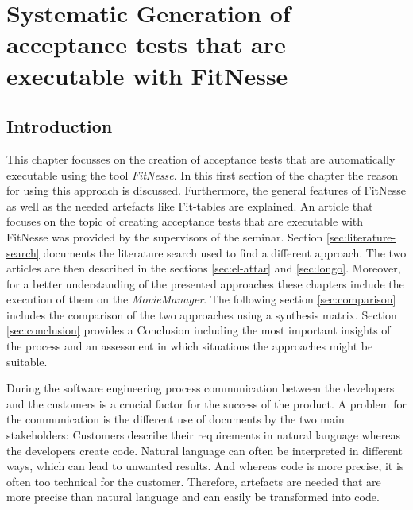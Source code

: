 

\chapter{Systematic Generation of acceptance tests that are executable with FitNesse}
\label{sec:topic_2}

\section{Introduction}

This chapter focusses on the creation of acceptance tests that are automatically executable using the tool \textit{FitNesse}.
In this first section of the chapter the reason for using this approach is discussed.
Furthermore, the general features of FitNesse as well as the needed artefacts like Fit-tables are explained.
An article that focuses on the topic of creating acceptance tests that are executable with FitNesse was provided by the supervisors of the seminar.
Section \ref{sec:literature-search} documents the literature search used to find a different approach.
The two articles are then described in the sections \ref{sec:el-attar} and \ref{sec:longo}.
Moreover, for a better understanding of the presented approaches these chapters include the execution of them on the \textit{MovieManager}.
The following section \ref{sec:comparison} includes the comparison of the two approaches using a synthesis matrix.
Section \ref{sec:conclusion} provides a Conclusion including the most important insights of the process and an assessment in which situations the approaches might be suitable.

During the software engineering process communication between the developers and the customers is a crucial factor for the success of the product.
A problem for the communication is the different use of documents by the two main stakeholders:
Customers describe their requirements in natural language whereas the developers create code.
Natural language can often be interpreted in different ways, which can lead to unwanted results.
And whereas code is more precise, it is often too technical for the customer.
Therefore, artefacts are needed that are more precise than natural language and can easily be transformed into code.

